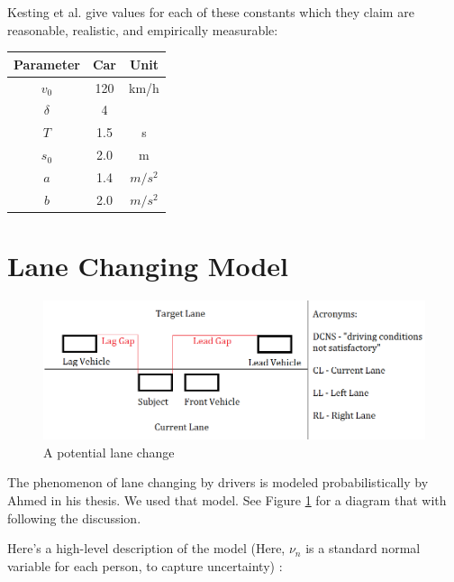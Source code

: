 Kesting et al. give values for each of these constants which they claim are reasonable, realistic, and empirically measurable:

\begin{center}
\begin{tabular}{ c c c }
\hline
Parameter & Car & Unit                  \\ \hline
$v_0$     & 120 & km/h                  \\
$\delta$   & 4   &                       \\
$T$        & 1.5 & s                     \\
$s_0$     & 2.0 & m                     \\
$a$        & 1.4 & $m/s^2$ \\
$b$        & 2.0 & $m/s^2$
\end{tabular}
\end{center}


\section{Lane Changing Model}

\begin{figure}
  \includegraphics[width=\linewidth]{Lane_Changing_Graphic.png}
  \caption{A potential lane change}
  \label{fig:kitty1}
\end{figure}

The phenomenon of lane changing by drivers is modeled probabilistically by Ahmed in his thesis. We used that model. See Figure \ref{fig:kitty1} for a diagram that with following the discussion.



Here’s a high-level description of the model (Here, $\nu_n$ is a standard normal variable for each person, to capture uncertainty) :

